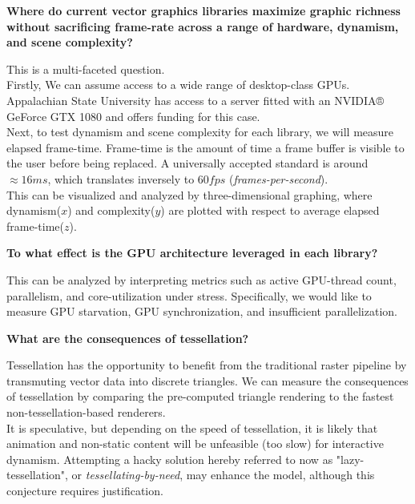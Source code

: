 \textbf{Where do current vector graphics libraries maximize graphic richness without sacrificing frame-rate across a range of hardware, dynamism, and scene complexity?}\\
\begin{adjustwidth}{2cm}{}
This is a multi-faceted question.\\

Firstly, We can assume access to a wide range of desktop-class GPUs. Appalachian State University has access to a server fitted with an NVIDIA® GeForce GTX 1080 and offers funding for this case.\\

Next, to test dynamism and scene complexity for each library, we will measure elapsed frame-time. Frame-time is the amount of time a frame buffer is visible to the user before being replaced. A universally accepted standard is around $\approx16ms$, which translates inversely to $60fps$ (\textit{frames-per-second}).\\

This can be visualized and analyzed by three-dimensional graphing, where dynamism($x$) and complexity($y$) are plotted with respect to average elapsed frame-time($z$).\\
\end{adjustwidth}

\textbf{To what effect is the GPU architecture leveraged in each library?}\\
\begin{adjustwidth}{2cm}{}
This can be analyzed by interpreting metrics such as active GPU-thread count, parallelism, and core-utilization under stress. Specifically, we would like to measure GPU starvation, GPU synchronization, and insufficient parallelization. \\
\end{adjustwidth}

\textbf{What are the consequences of tessellation?}\label{sec:lazy_tess}\\
\begin{adjustwidth}{2cm}{}
Tessellation has the opportunity to benefit from the traditional raster pipeline by transmuting vector data into discrete triangles. We can measure the consequences of tessellation by comparing the pre-computed triangle rendering to the fastest non-tessellation-based renderers.\\

It is speculative, but depending on the speed of tessellation, it is likely that animation and non-static content will be unfeasible (too slow) for interactive dynamism. Attempting a hacky solution hereby referred to now as "lazy-tessellation", or \emph{tessellating-by-need}, may enhance the model, although this conjecture requires justification.\\
\end{adjustwidth}

